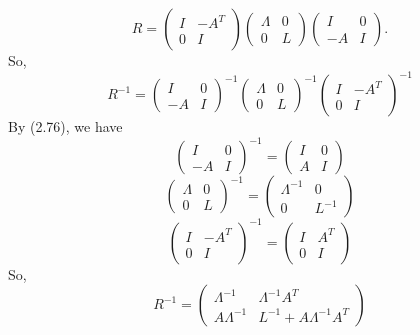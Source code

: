 \documentclass[a4paper, 11pt]{article}
\begin{document}
\[
R=
\begin{pmatrix}I&-A^T\\0&I\end{pmatrix}
\begin{pmatrix}\Lambda&0\\0&L\end{pmatrix}
\begin{pmatrix}I&0\\-A&I\end{pmatrix}.
\]
So,
\[
R^{-1}=\begin{pmatrix}I&0\\-A&I\end{pmatrix}^{-1}\begin{pmatrix}\Lambda&0\\0&L\end{pmatrix}^{-1}\begin{pmatrix}I&-A^T\\0&I\end{pmatrix}^{-1}
\]
By (2.76), we have
\[
\begin{pmatrix}I&0\\-A&I\end{pmatrix}^{-1}=\begin{pmatrix}
I&0\\A&I
\end{pmatrix}
\]
\[
\begin{pmatrix}\Lambda&0\\0&L\end{pmatrix}^{-1}=\begin{pmatrix}
\Lambda^{-1}&0\\0&L^{-1}
\end{pmatrix}
\]
\[
\begin{pmatrix}I&-A^T\\0&I\end{pmatrix}^{-1}=\begin{pmatrix}
I&A^T\\0&I
\end{pmatrix}
\]
So,
\[
R^{-1}=\begin{pmatrix}
    \Lambda^{-1}&\Lambda^{-1}A^T\\
    A\Lambda^{-1}&L^{-1}+A\Lambda^{-1}A^T
\end{pmatrix}
\]
\end{document}
